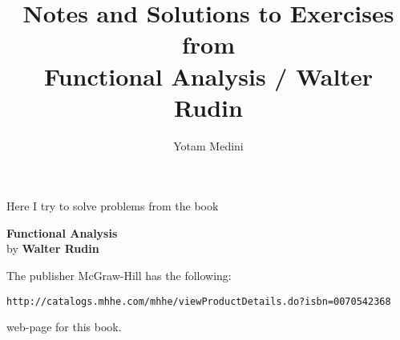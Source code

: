 \usepackage{array}
\usepackage{bm}



\title{Notes and Solutions to Exercises \\
          from \\
       Functional Analysis / Walter Rudin}
\author{Yotam Medini}


\newcommand{\ellone}{\ensuremath{\ell^1}}
\newcommand{\ellp}{\ensuremath{\ell^p}}
\newcommand{\ellinf}{\ensuremath{\ell^\infty}}


\newcommand{\unfinished}{\par\textbf{Unfinished !!!!!!!!!!!!!}\par}
\newcommand{\upstar}{\raise.5ex\hbox{\(*\)}}

\newcommand{\hull}{\mathop{\rm hull}\nolimits}
\newcommand{\id}{\mathop{\rm id}\nolimits}
\newcommand{\Int}{\mathop{\rm Int}\nolimits}



\maketitle
\newpage
\tableofcontents
\newpage


\maketitle

\setcounter{chapter}{-1}

Here I try to solve problems
from the book \cite{RudinFA79}
\begin{center}
\textbf{Functional Analysis}\\
by
\textbf{Walter Rudin}
\end{center}

The publisher  McGraw-Hill has the following:
\begin{center}
\texttt{http://catalogs.mhhe.com/mhhe/viewProductDetails.do?isbn=0070542368}
\end{center}
web-page for this book.


